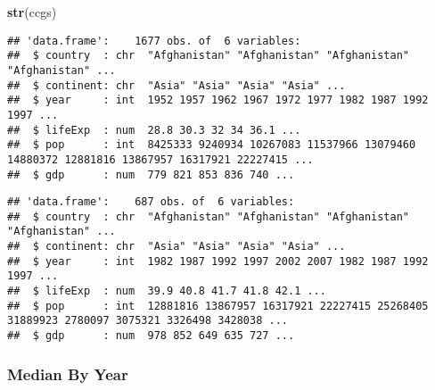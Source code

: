 \documentclass[
]{article}
\newenvironment{Shaded}{\begin{snugshade}}{\end{snugshade}}
\newcommand{\DecValTok}[1]{\textcolor[rgb]{0.00,0.00,0.81}{#1}}
\newcommand{\KeywordTok}[1]{\textcolor[rgb]{0.13,0.29,0.53}{\textbf{#1}}}
\newcommand{\NormalTok}[1]{#1}
\newcommand{\OperatorTok}[1]{\textcolor[rgb]{0.81,0.36,0.00}{\textbf{#1}}}
\newcommand{\StringTok}[1]{\textcolor[rgb]{0.31,0.60,0.02}{#1}}
\begin{document}
\begin{Shaded}
\begin{Highlighting}[]
\KeywordTok{str}\NormalTok{(ccgs)}
\end{Highlighting}
\end{Shaded}

\begin{verbatim}
## 'data.frame':    1677 obs. of  6 variables:
##  $ country  : chr  "Afghanistan" "Afghanistan" "Afghanistan" "Afghanistan" ...
##  $ continent: chr  "Asia" "Asia" "Asia" "Asia" ...
##  $ year     : int  1952 1957 1962 1967 1972 1977 1982 1987 1992 1997 ...
##  $ lifeExp  : num  28.8 30.3 32 34 36.1 ...
##  $ pop      : int  8425333 9240934 10267083 11537966 13079460 14880372 12881816 13867957 16317921 22227415 ...
##  $ gdp      : num  779 821 853 836 740 ...
\end{verbatim}

\begin{Shaded}
\end{Shaded}

\begin{verbatim}
## 'data.frame':    687 obs. of  6 variables:
##  $ country  : chr  "Afghanistan" "Afghanistan" "Afghanistan" "Afghanistan" ...
##  $ continent: chr  "Asia" "Asia" "Asia" "Asia" ...
##  $ year     : int  1982 1987 1992 1997 2002 2007 1982 1987 1992 1997 ...
##  $ lifeExp  : num  39.9 40.8 41.7 41.8 42.1 ...
##  $ pop      : int  12881816 13867957 16317921 22227415 25268405 31889923 2780097 3075321 3326498 3428038 ...
##  $ gdp      : num  978 852 649 635 727 ...
\end{verbatim}

\hypertarget{median-by-year}{%
\subsubsection{Median By Year}\label{median-by-year}}
\end{document}
